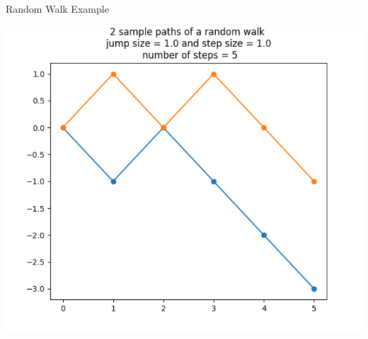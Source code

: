 \documentclass{beamer}%
\numberwithin{equation}{section}
\begin{document}

\begin{frame}{Random Walk Example}
	\begin{center}
		\includegraphics[scale=.6]{randomwalk5steps.png}
	\end{center}
\end{frame}
\end{document}

